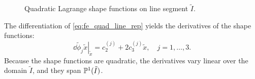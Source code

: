 \begin{figure}
  \centering
  \caption{Quadratic Lagrange shape functions on line segment $\tilde I$. \label{fig:fe_shape_line_p2}}
\end{figure}
The differentiation of \ref{eq:fe_quad_line_rep} yields the derivatives of the shape functions:
\begin{equation*}
  \left. \dd{\tilde \phi_j}{\tilde x} \right|_{\tilde x} = c_2^{(j)} + 2 c_3^{(j)} \tilde x , \quad j = 1,\dots,3.
\end{equation*}
Because the shape functions are quadratic, the derivatives vary linear over the domain $\tilde I$, and they span $\mathbb{P}^1(\tilde I)$.

